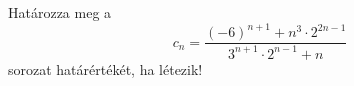 \documentclass[11pt]{scrartcl}
\begin{document}
Határozza meg a
\[
	c_n = \frac{
		(-6)^{n + 1} + n^3 \cdot 2^{2n - 1}
	}{
		3^{n + 1} \cdot 2^{n - 1} + n
	}
\]
sorozat határértékét, ha létezik!
\end{document}
